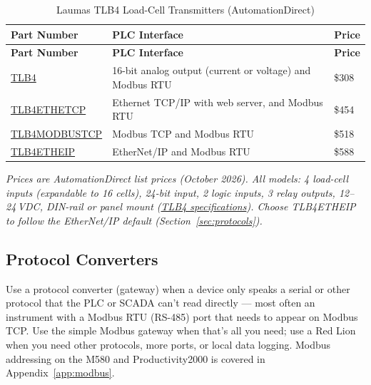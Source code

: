 \begin{longtable}{@{}P{3.89cm}P{10.90cm}P{2.14cm}@{}}
\caption{Laumas TLB4 Load-Cell Transmitters (AutomationDirect)}\label{tab:tlb4} \\
\toprule
{}\textbf{Part Number} & \textbf{PLC Interface} & \textbf{Price} \\
\midrule
\endfirsthead
\toprule
{}\textbf{Part Number} & \textbf{PLC Interface} & \textbf{Price} \\
\midrule
\endhead
\href{https://www.automationdirect.com/adc/shopping/catalog/process_control_-a-_measurement/weight_-z-_force_sensors_-a-_electronics/controllers_-a-_electronics/tlb4}{TLB4} & 16-bit analog output (current or voltage) and Modbus RTU & \$308 \\
\href{https://www.automationdirect.com/adc/shopping/catalog/process_control_-a-_measurement/weight_-z-_force_sensors_-a-_electronics/controllers_-a-_electronics/tlb4ethetcp}{TLB4ETHETCP} & Ethernet TCP/IP with web server, and Modbus RTU & \$454 \\
\href{https://www.automationdirect.com/adc/shopping/catalog/process_control_-a-_measurement/weight_-z-_force_sensors_-a-_electronics/controllers_-a-_electronics/tlb4modbustcp}{TLB4MODBUSTCP} & Modbus TCP and Modbus RTU & \$518 \\
\href{https://www.automationdirect.com/adc/shopping/catalog/process_control_-a-_measurement/weight_-z-_force_sensors_-a-_electronics/controllers_-a-_electronics/tlb4etheip}{TLB4ETHEIP} & EtherNet/IP and Modbus RTU & \$588 \\
\bottomrule
\end{longtable}
\textit{\small Prices are AutomationDirect list prices (October 2026). All models: 4 load-cell inputs (expandable to 16 cells), 24-bit input, 2 logic inputs, 3 relay outputs, 12--24\,VDC, DIN-rail or panel mount (\href{https://cdn.automationdirect.com/static/specs/laumastlb4.pdf}{TLB4 specifications}). Choose TLB4ETHEIP to follow the EtherNet/IP default (Section~\ref{sec:protocols}).}


\subsection{Protocol Converters}\label{sec:protocol-converters}
Use a protocol converter (gateway) when a device only speaks a serial or other protocol that the PLC or SCADA can't read directly --- most often an instrument with a Modbus RTU (RS-485) port that needs to appear on Modbus TCP. Use the simple Modbus gateway when that's all you need; use a Red Lion when you need other protocols, more ports, or local data logging. Modbus addressing on the M580 and Productivity2000 is covered in Appendix~\ref{app:modbus}.

